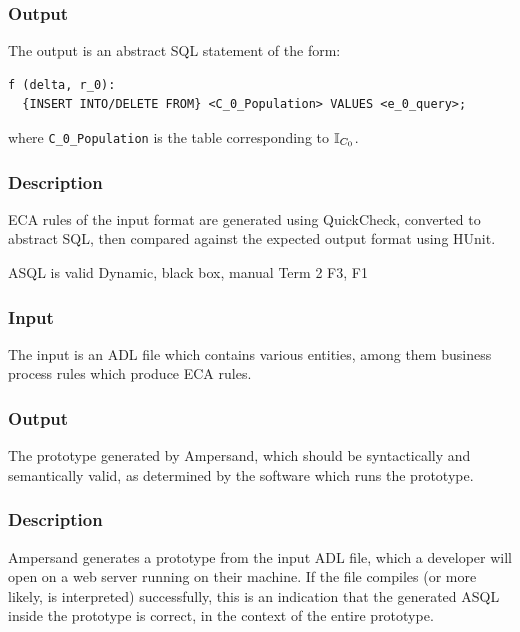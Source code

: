 \documentclass[12pt]{report}
\begin{document}
\vspace{-12pt}\subsubsection*{Output}

The output is an abstract SQL statement of the form:
\begin{verbatim}
f (delta, r_0):
  {INSERT INTO/DELETE FROM} <C_0_Population> VALUES <e_0_query>;
\end{verbatim}

\noindent where \verb|C_0_Population| is the table corresponding to $\mathbb{I}_{C_0}$. 

\vspace{-12pt}\subsubsection*{Description}

ECA rules of the input format are generated using QuickCheck, converted to
  abstract SQL, then compared against the expected output format using HUnit.


{ASQL is valid} 
{Dynamic, black box, manual}  
{Term 2}
{F3, F1}
\vspace{-12pt}\subsubsection*{Input} 

The input is an ADL file which contains various entities, among them business
process rules which produce ECA rules.

\vspace{-12pt}\subsubsection*{Output}

The prototype generated by Ampersand, which should be syntactically and
semantically valid, as determined by the software which runs the prototype.

\vspace{-12pt}\subsubsection*{Description}

Ampersand generates a prototype from the input ADL file, which a developer will
open on a web server running on their machine. If the file compiles (or more
likely, is interpreted) successfully, this is an indication that the generated
ASQL inside the prototype is correct, in the context of the entire prototype. 
\end{document}
